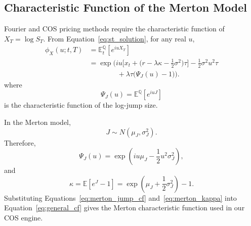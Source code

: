 \documentclass[12pt]{article}
\begin{document}
\subsection*{Characteristic Function of the Merton Model}

Fourier and COS pricing methods require the characteristic function of $X_T=\log S_T$. From Equation~\eqref{eq:st_solution}, for any real $u$,
\begin{equation}
\begin{aligned}
\phi_X(u;t,T)
&= \mathbb{E}_t^{\mathbb{Q}}\!\left[e^{iuX_T}\right] \\
&= \exp\!\Bigg(
iu\Big[x_t+\Big(r-\lambda\kappa-\tfrac12\sigma^2\Big)\tau\Big]
-\tfrac12\sigma^2u^2\tau \\
&\qquad\qquad
+\lambda\tau\big(\Psi_J(u)-1\big)
\Bigg).
\end{aligned}
\label{eq:general_cf}
\end{equation}
where
\begin{equation}
\Psi_J(u)=\mathbb{E}^{\mathbb{Q}}[e^{iuJ}]
\label{eq:jump_cf}
\end{equation}
is the characteristic function of the log-jump size.

In the Merton model,
\begin{equation}
J\sim N(\mu_J,\sigma_J^2).
\end{equation}
Therefore,
\begin{equation}
\Psi_J(u)=\exp\left(iu\mu_J-\frac12u^2\sigma_J^2\right),
\label{eq:merton_jump_cf}
\end{equation}
and
\begin{equation}
\kappa=\mathbb{E}[e^J-1]
=\exp\left(\mu_J+\frac12\sigma_J^2\right)-1.
\label{eq:merton_kappa}
\end{equation}
Substituting Equations~\eqref{eq:merton_jump_cf} and~\eqref{eq:merton_kappa} into Equation~\eqref{eq:general_cf} gives the Merton characteristic function used in our COS engine.
\end{document}
